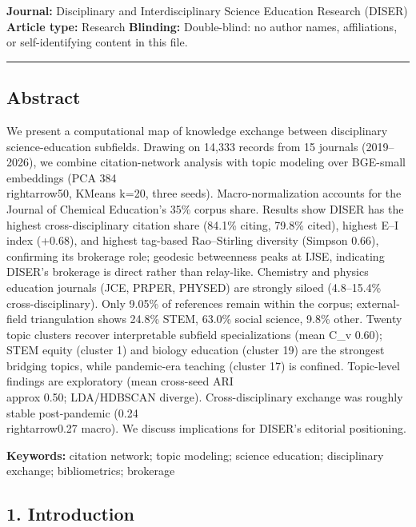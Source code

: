 \documentclass[pdflatex,sn-apa]{sn-jnl}
\begin{document}
\textbf{Journal:} Disciplinary and Interdisciplinary Science Education
Research (DISER) \textbf{Article type:} Research \textbf{Blinding:}
Double-blind: no author names, affiliations, or self-identifying content
in this file.

\begin{center}\rule{0.5\linewidth}{0.5pt}\end{center}

\subsection{Abstract}\label{abstract}

We present a computational map of knowledge exchange between
disciplinary science-education subfields. Drawing on 14,333 records from
15 journals (2019--2026), we combine citation-network analysis with
topic modeling over BGE-small embeddings (PCA 384\\rightarrow50, KMeans k=20, three
seeds). Macro-normalization accounts for the Journal of Chemical
Education's 35\% corpus share. Results show DISER has the highest
cross-disciplinary citation share (84.1\% citing, 79.8\% cited), highest
E--I index (+0.68), and highest tag-based Rao--Stirling diversity
(Simpson 0.66), confirming its brokerage role; geodesic betweenness
peaks at IJSE, indicating DISER's brokerage is direct rather than
relay-like. Chemistry and physics education journals (JCE, PRPER,
PHYSED) are strongly siloed (4.8--15.4\% cross-disciplinary). Only
9.05\% of references remain within the corpus; external-field
triangulation shows 24.8\% STEM, 63.0\% social science, 9.8\% other.
Twenty topic clusters recover interpretable subfield specializations
(mean C\_v 0.60); STEM equity (cluster 1) and biology education (cluster
19) are the strongest bridging topics, while pandemic-era teaching
(cluster 17) is confined. Topic-level findings are exploratory (mean
cross-seed ARI \\approx 0.50; LDA/HDBSCAN diverge). Cross-disciplinary exchange
was roughly stable post-pandemic (0.24\\rightarrow0.27 macro). We discuss
implications for DISER's editorial positioning.

\textbf{Keywords:} citation network; topic modeling; science education;
disciplinary exchange; bibliometrics; brokerage

\subsection{1. Introduction}\label{introduction}
\end{document}
